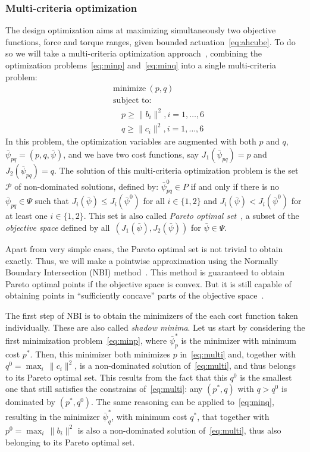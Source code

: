 \documentclass[review]{elsarticle}
\begin{document}
\subsubsection{Multi-criteria optimization}
\label{sec:multi-crit-optim}

The design optimization aims at maximizing simultaneously two
objective functions, force and torque ranges, given bounded
actuation~\eqref{eq:ahcube}. To do so we will take a multi-criteria
optimization approach~\cite{statnikov95}, combining the
optimization problems~\eqref{eq:minp}
and~\eqref{eq:minq} into a single multi-criteria problem:
\begin{equation}
  \label{eq:multi}
  \begin{split}
    &\text{minimize}\:(p, q) \\
    &\text{subject to:} \\
    &\quad p \geq \|b_i\|^2, i=1,\ldots,6 \\
    &\quad q \geq \|c_i\|^2, i=1,\ldots,6
  \end{split}
\end{equation}
In this problem, the optimization variables are augmented with both
$p$ and $q$, $\bar{\psi}_{pq}=(p, q, \bar{\psi})$, and we have two
cost functions, say $J_1(\bar{\psi}_{pq})=p$ and
$J_2(\bar{\psi}_{pq})=q$. The solution of this multi-criteria
optimization problem is the set $\mathcal{P}$ of non-dominated
solutions, defined by: $\bar{\psi}_{pq}^0\in P$ if and only if there is no
$\bar{\psi}_{pq}\in\Psi$ such that
$J_i(\bar{\psi})\leq J_i(\bar{\psi}^0)$ for all $i\in\{1,2\}$ and
$J_i(\bar{\psi})< J_i(\bar{\psi}^0)$ for at least one
$i\in\{1,2\}$. This set is also called \emph{Pareto optimal
  set}~\cite{statnikov95}, a subset of the \emph{objective space}
defined by all~$(J_1(\bar{\psi}),J_2(\bar{\psi}))$ for
$\bar{\psi}\in\Psi$.

Apart from very simple cases, the Pareto optimal set is not trivial to
obtain exactly. Thus, we will make a pointwise approximation using the
Normally Boundary Intersection (NBI) method~\cite{das98}. This method
is guaranteed to obtain Pareto optimal points if the objective space
is convex. But it is still capable of obtaining points in ``sufficiently
concave'' parts of the objective space~\cite{das98}.

The first step of NBI is to obtain the minimizers of the each cost
function taken individually. These are also called \emph{shadow
  minima}. Let us start by considering the first minimization
problem~\eqref{eq:minp}, where $\bar{\psi}^*_p$ is the minimizer with
minimum cost $p^*$.  Then, this minimizer both minimizes $p$
in~\eqref{eq:multi} and, together with $q^0=\max_i\,\|c_i\|^2$, is a
non-dominated solution of~\eqref{eq:multi}, and thus belongs to its
Pareto optimal set. This results from the fact that this $q^0$ is the
smallest one that still satisfies the constrains of~\eqref{eq:multi}:
any $(p^*,q)$ with $q>q^0$ is dominated by $(p^*,q^0)$.  The same
reasoning can be applied to~\eqref{eq:minq}, resulting in the
minimizer $\bar{\psi}^*_q$, with minimum cost $q^*$, that together
with $p^0=\max_i\,\|b_i\|^2$ is also a non-dominated solution
of~\eqref{eq:multi}, thus also belonging to its Pareto optimal set.
\end{document}
